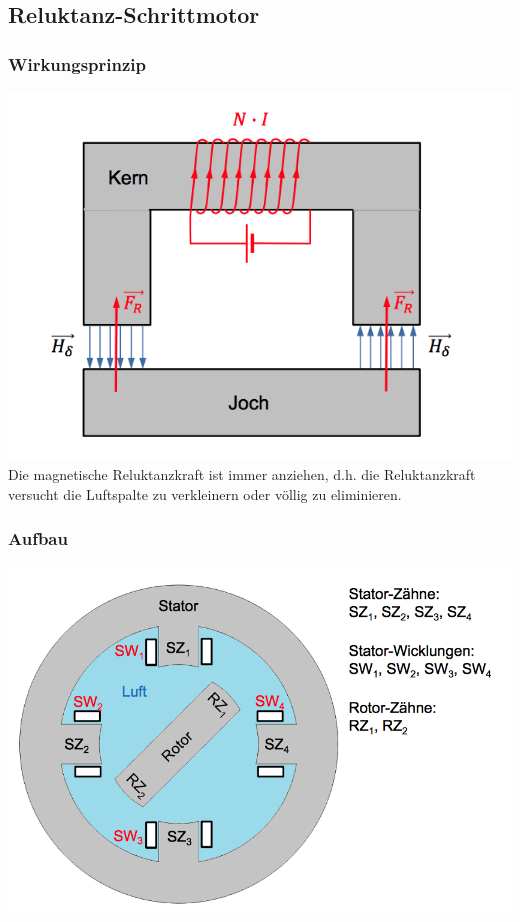 \subsection{Reluktanz-Schrittmotor}
\begin{minipage}{0.5 \linewidth}
\subsubsection{Wirkungsprinzip}
\includegraphics[width = \linewidth]{./Pics/VL67/WirkungRe}
Die magnetische Reluktanzkraft ist immer anziehen, d.h. die Reluktanzkraft versucht die Luftspalte zu verkleinern oder völlig zu eliminieren.
\end{minipage}
\begin{minipage}{0.5 \linewidth}
\subsubsection{Aufbau}
\includegraphics[width = \linewidth]{./Pics/VL67/AufbauRe}
\end{minipage}

